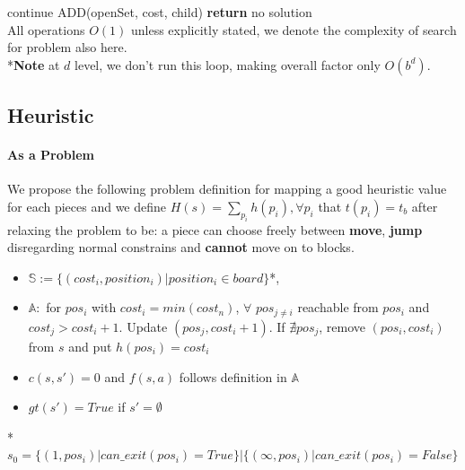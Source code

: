 \documentclass[10.5pt,a4paper]{article}
\begin{document}
\begin{algorithm}[ht]
\begin{algorithmic}[1]
                            continue
                            \State ADD(openSet, cost, child)
                        \EndIf
                    \EndFor
                \EndWhile
                \State \textbf{return} no solution
                \EndProcedure\\
                All operations $O(1)$ unless explicitly stated, we denote the complexity of search for problem also here.\\
                *\textbf{Note} at $d$ level, we don't run this loop, making overall factor only $O(b^d)$.
            \end{algorithmic}
        \end{algorithm}
    \vspace{-10pt}
    \subsection{Heuristic}
        \paragraph{As a Problem} We propose the following problem definition for mapping a good heuristic value for each pieces and we define $H(s) = \sum_{p_i}h(p_i), \forall p_i$ that $t(p_i) = t_b$ after relaxing the problem to be: a piece can choose freely between \textbf{move}, \textbf{jump} disregarding normal constrains and \textbf{cannot} move on to blocks.
        \begin{itemize}
            \itemsep0em   
            \item $\mathbb{S} := \{(cost_i, position_i)|position_i\in board\}$*,
            \item $\mathbb{A} :$ for $pos_i$ with $cost_i=min({cost_n})$, $\forall$ $pos_{j\ne i} $ reachable from $pos_i$ and $cost_j > cost_i+1$. Update $(pos_j, cost_i + 1)$. If $\nexists pos_j$, remove $(pos_i, cost_i)$ from $s$ and put $h(pos_i) = cost_i$
            \item $c(s, s')=0$ and $f(s,a)$ follows definition in $\mathbb{A}$
            \item $gt(s')=True$ if $s' = \emptyset$
        \end{itemize}
        \vspace{-5pt}
        *$s_0 = \{(1, pos_i)|can\_exit(pos_i) = True\} | \{(\infty, pos_i)|can\_exit(pos_i) = False\}$
        \vspace{-10pt}
\end{document}
